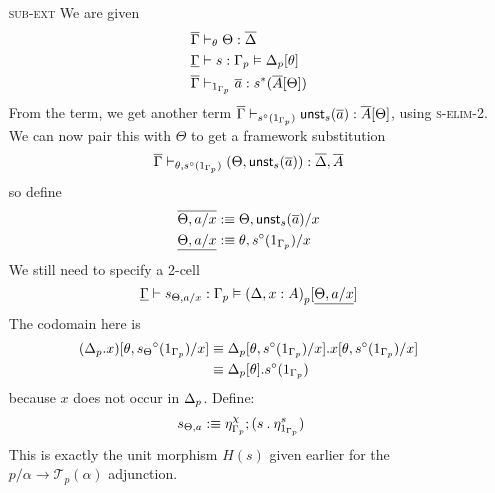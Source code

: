 \documentclass[10pt]{article}
\theoremstyle{definition}
\newcommand{\yields}{\vdash}
\newcommand\UnSt[2]{\ensuremath{\mathsf{unst}_{#1}(#2)}}
\newcommand\TrCirc[2]{\ensuremath{{#1}^\circ(#2)}}
\newcommand\El[2]{\mathcal{T}_{#1}(#2)}
\newcommand\bdot[0]{\mathbin{.}}
\begin{document}
\begin{enumerate}
\item[\textsc{sub-ext}] We are given
\begin{align*}
\upstairs{\Gamma} &\yields_{\theta} \Theta : \upstairs{\Delta} \\
\downstairs{\Gamma} &\yields s : \asdep{\Gamma} \vDash \asdep{\Delta}[\theta] \\
\upstairs{\Gamma} &\yields_{1_{\asdep{\Gamma}}} \upstairs{a} : s^*(\upstairs{A}[\Theta])
\end{align*}
From the term, we get another term $\upstairs{\Gamma}\yields_{\TrCirc{s}{1_{\asdep{\Gamma}}}} \UnSt{s}{\upstairs{a}} : \upstairs{A}[\Theta]$, using \textsc{s-elim-2}. We can now pair this with $\Theta$ to get a framework substitution \[\upstairs{\Gamma} \yields_{\theta, \TrCirc{s}{1_{\asdep{\Gamma}}}} (\Theta, \UnSt{s}{\upstairs{a}}) : \upstairs{\Delta}, \upstairs{A}\]
so define
\begin{align*}
\upstairs{\Theta, a/x} &:\equiv \Theta, \UnSt{s}{\upstairs{a}}/x \\
\downstairs{\Theta, a/x} &:\equiv \theta, \TrCirc{s}{1_{\asdep{\Gamma}}}/x
\end{align*}
We still need to specify a 2-cell 
\[
\downstairs{\Gamma} \yields s_{\Theta, a/x} : \asdep{\Gamma} \vDash \asdep{(\Delta, x : A)}[\downstairs{\Theta, a/x}]
\]
The codomain here is
\begin{align*}
(\asdep{\Delta}.x)[\theta, \TrCirc{s_{\Theta}}{1_{\asdep{\Gamma}}}/x] 
&\equiv \asdep{\Delta}[\theta, \TrCirc{s}{1_{\asdep{\Gamma}}}/x].x[\theta, \TrCirc{s}{1_{\asdep{\Gamma}}}/x] \\
&\equiv \asdep{\Delta}[\theta].\TrCirc{s}{1_{\asdep{\Gamma}}}
\end{align*}
because $x$ does not occur in ${\Delta}_p$. Define:
\begin{align*}
s_{\Theta, a} &:\equiv \eta^\chi_{\asdep{\Gamma}}; (s \bdot \eta_{1_{\asdep{\Gamma}}}^{s})
\end{align*}
This is exactly the unit morphism $H(s)$ given earlier for the $p/\alpha \to \El{p}{\alpha}$ adjunction.


\end{enumerate}
\end{document}
